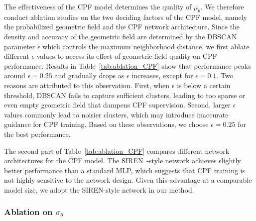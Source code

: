 \documentclass[lettersize,journal]{IEEEtran}
\begin{document}
The effectiveness of the CPF model determines the quality of $\mu_{\theta}$. 
We therefore conduct ablation studies on the two deciding factors of the CPF model, 
namely the probabilized geometric field and the CPF network architecture.
Since the density and accuracy of the geometric field are determined by the DBSCAN parameter $\epsilon$ which controls the maximum neighborhood distance, we first ablate different $\epsilon$ values to access its effect of geometric field quality on CPF performance.
Results in Table~\ref{tab:ablation_CPF} show that performance peaks around $\epsilon = 0.25$ and gradually drops as $\epsilon$ increases, except for $\epsilon = 0.1$. Two reasons are attributed to this observation. 
First, when $\epsilon$ is below a certain threshold, DBSCAN fails to capture sufficient clusters, leading to too sparse or even empty geometric field that dampens CPF supervision.
Second, larger $\epsilon$ values commonly lead to noisier clusters, which may introduce inaccurate guidance for CPF training. 
Based on these observations, we choose $\epsilon = 0.25$ for the best performance.

The second part of Table~\ref{tab:ablation_CPF} compares different network architectures for the CPF model. 
The SIREN~\cite{implicit}-style network achieves slightly better performance than a standard MLP, which suggests that CPF training is not highly sensitive to the network design. 
Given this advantage at a comparable model size, we adopt the SIREN-style network in our method.


\subsubsection{Ablation on $\sigma_{\theta}$}
\end{document}
